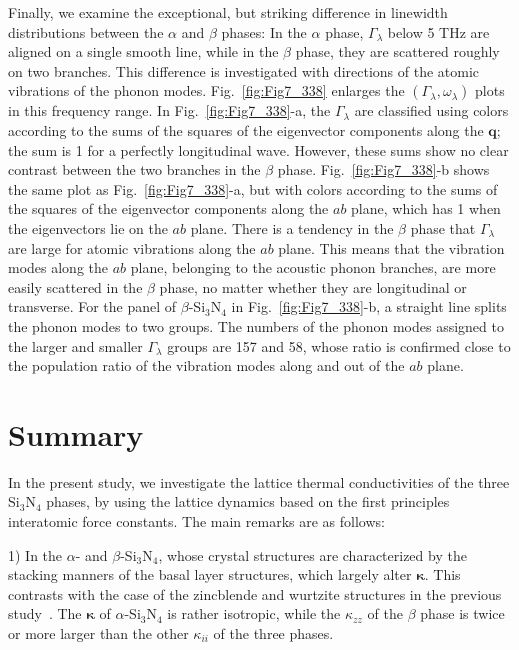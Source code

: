 \documentclass[twocolumn,amsmath,amssymb,a4paper,prb,superscriptaddress,floatfix]{revtex4-1}
\begin{document}
Finally, we examine the exceptional, but striking difference in linewidth
distributions between the $\alpha$ and $\beta$ phases: In the $\alpha$ phase,
$\Gamma_\lambda$ below 5 THz are aligned on a single smooth line, while in the
$\beta$ phase, they are scattered roughly on two branches.  This difference is
investigated with directions of the atomic vibrations of the phonon modes.
Fig.~\ref{fig:Fig7_338} enlarges the $(\Gamma_\lambda,\omega_\lambda)$ plots in
this frequency range. In Fig.~\ref{fig:Fig7_338}-a, the $\Gamma_\lambda$ are
classified using colors according to the sums of the squares of the eigenvector
components along the $\mathbf{q}$; the sum is 1 for a perfectly longitudinal
wave. However, these sums show no clear contrast between the two branches in the
$\beta$ phase.  Fig.~\ref{fig:Fig7_338}-b shows the same plot as
Fig.~\ref{fig:Fig7_338}-a, but with colors according to the sums of the squares
of the eigenvector components along the $ab$ plane, which has 1 when the
eigenvectors lie on the $ab$ plane. There is a tendency in the $\beta$ phase
that  $\Gamma_\lambda$ are large for atomic vibrations along the $ab$ plane.
This means that the vibration modes along the $ab$ plane, belonging to the
acoustic phonon branches, are more easily scattered in the $\beta$ phase, no
matter whether they are longitudinal or transverse. For the panel of
$\beta$-Si$_3$N$_4$ in Fig.~\ref{fig:Fig7_338}-b, a straight line splits the
phonon modes to two groups. The numbers of the phonon modes assigned to the
larger and smaller $\Gamma_\lambda$ groups are 157 and 58, whose ratio is
confirmed close to the population ratio of the vibration modes along and out of
the $ab$ plane.


\section{Summary}

In the present study, we investigate the lattice thermal conductivities of the
three Si$_3$N$_4$ phases, by using the lattice dynamics based on the first
principles interatomic force constants. The main remarks are as follows:

1) In the $\alpha$- and $\beta$-Si$_3$N$_4$, whose crystal structures are
characterized by the stacking manners of the basal layer structures, which
largely alter $\boldsymbol{\kappa}$. This contrasts with the case of
the zincblende and wurtzite structures in the previous study~\cite{phono3py}.
The $\boldsymbol{\kappa}$ of $\alpha$-Si$_3$N$_4$ is rather isotropic, while the
$\kappa$$_{zz}$ of the $\beta$ phase is twice or more larger than the other
$\kappa_{ii}$ of the three phases.
\end{document}
